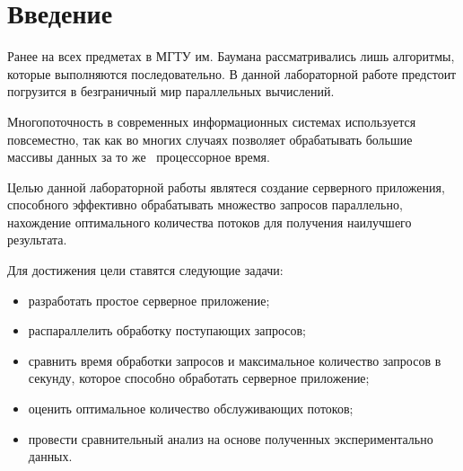 \chapter*{Введение}

Ранее на всех предметах в МГТУ им. Баумана рассматривались лишь алгоритмы,
которые выполняются последовательно. В данной лабораторной работе предстоит
погрузится в безграничный мир параллельных вычислений.

Многопоточность в современных информационных системах используется повсеместно,
так как во многих случаях позволяет обрабатывать большие массивы данных
за то же  процессорное время.

Целью данной лабораторной работы являтеся создание серверного приложения, способного эффективно обрабатывать множество запросов параллельно, нахождение оптимального количества потоков для получения наилучшего результата.

Для достижения цели ставятся следующие задачи:
\begin{itemize}
	\item разработать простое серверное приложение;
	\item распараллелить обработку поступающих запросов;
	\item сравнить время обработки запросов и максимальное количество запросов в секунду, которое способно обработать серверное приложение;
	\item оценить оптимальное количество обслуживающих потоков;
	\item провести сравнительный анализ на основе полученных экспериментально данных.
\end{itemize}
